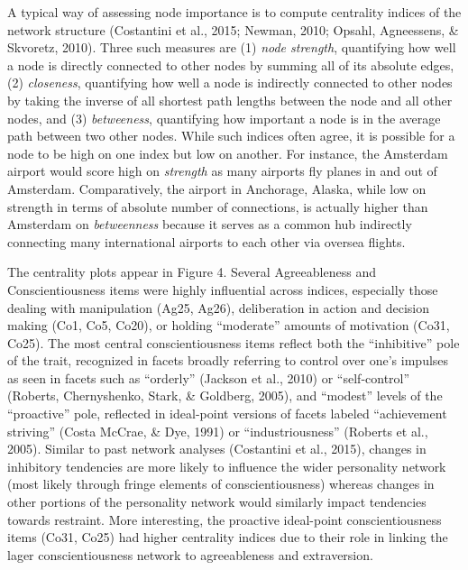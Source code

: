 \documentclass[man]{apa6}
\begin{document}
A typical way of assessing node importance is to compute centrality
indices of the network structure (Costantini et al., 2015; Newman, 2010;
Opsahl, Agneessens, \& Skvoretz, 2010). Three such measures are (1)
\emph{node strength}, quantifying how well a node is directly connected
to other nodes by summing all of its absolute edges, (2)
\emph{closeness}, quantifying how well a node is indirectly connected to
other nodes by taking the inverse of all shortest path lengths between
the node and all other nodes, and (3) \emph{betweeness}, quantifying how
important a node is in the average path between two other nodes. While
such indices often agree, it is possible for a node to be high on one
index but low on another. For instance, the Amsterdam airport would
score high on \emph{strength} as many airports fly planes in and out of
Amsterdam. Comparatively, the airport in Anchorage, Alaska, while low on
strength in terms of absolute number of connections, is actually higher
than Amsterdam on \emph{betweenness} because it serves as a common hub
indirectly connecting many international airports to each other via
oversea flights.

The centrality plots appear in Figure 4. Several Agreeableness and
Conscientiousness items were highly influential across indices,
especially those dealing with manipulation (Ag25, Ag26), deliberation in
action and decision making (Co1, Co5, Co20), or holding
\enquote{moderate} amounts of motivation (Co31, Co25). The most central
conscientiousness items reflect both the \enquote{inhibitive} pole of
the trait, recognized in facets broadly referring to control over one's
impulses as seen in facets such as \enquote{orderly} (Jackson et al.,
2010) or \enquote{self-control} (Roberts, Chernyshenko, Stark, \&
Goldberg, 2005), and \enquote{modest} levels of the \enquote{proactive}
pole, reflected in ideal-point versions of facets labeled
\enquote{achievement striving} (Costa McCrae, \& Dye, 1991) or
\enquote{industriousness} (Roberts et al., 2005). Similar to past
network analyses (Costantini et al., 2015), changes in inhibitory
tendencies are more likely to influence the wider personality network
(most likely through fringe elements of conscientiousness) whereas
changes in other portions of the personality network would similarly
impact tendencies towards restraint. More interesting, the proactive
ideal-point conscientiousness items (Co31, Co25) had higher centrality
indices due to their role in linking the lager conscientiousness network
to agreeableness and extraversion.
\end{document}
